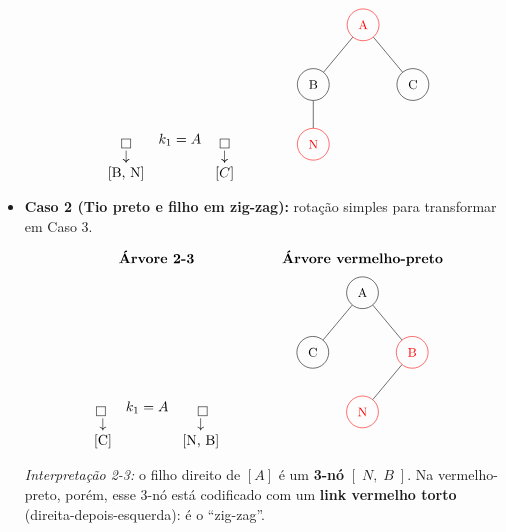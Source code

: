 \begin{itemize}
\begin{center}
\[\begin{array}{ccc}
\begin{array}{ccc}
  \boxed{}           & k_1 = A & \boxed{} \\
  \downarrow         &         & \downarrow      \\
  \text{[B,  N]}     &         & [C]       \\
\end{array}


&\qquad&
\begin{tikzpicture}[
  every node/.style={draw, circle, minimum size=8mm, inner sep=0pt, font=\small},
  level distance=1.5cm, sibling distance=2.5cm
]
\tikzset{
  preto/.style={draw=black},
  vermelho/.style={draw=red, text=red}
}
\node[vermelho] {A}
  child {
    node[preto] {B}
      child[grow=down] { node[vermelho] {N} }
  }
  child { node[preto] {C} };
\end{tikzpicture}
\end{array}
\]
\end{center}


\item \textbf{Caso 2 (Tio preto e filho em zig-zag):} rotação simples para transformar em Caso 3.

\begin{center}
\renewcommand{\arraystretch}{1.5}
\[
\begin{array}{ccc}
\textbf{Árvore 2-3} & & \textbf{Árvore vermelho-preto} \\[6pt]

\begin{array}{ccc}
  \boxed{} \;     & k_1 = A & \; \boxed{} \\
  \downarrow      &         &   \downarrow   \\
  \text{[C]}      &         & \text{[N, B]} \\
\end{array}
&\qquad&
\begin{tikzpicture}[
  every node/.style={draw, circle, minimum size=8mm, inner sep=0pt, font=\small},
  level distance=1.5cm, sibling distance=2.5cm
]
\tikzset{
  preto/.style={draw=black},
  vermelho/.style={draw=red, text=red}
}
\node[preto] {A}
  child { node[preto] {C} }
  child {
    node[vermelho] {B}
      child { node[vermelho] {N} } %
      child[missing]
  };
\end{tikzpicture}
\end{array}
\]
\end{center}

\noindent
\emph{Interpretação 2-3:} o filho direito de \([A]\) é um \textbf{3-nó} \([\;N,\;B\;]\).  
Na vermelho-preto, porém, esse 3-nó está codificado com um \textbf{link vermelho torto} (direita-depois-esquerda): é o “zig-zag”.


\end{itemize}
